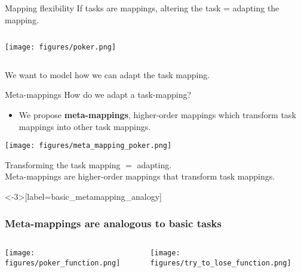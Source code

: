 \documentclass{beamer}
\begin{document}
\begin{frame}{Mapping flexibility}
If tasks are mappings, altering the task = adapting the mapping. 
\begin{columns}
\begin{column}{0.5\textwidth}
\vspace{2em}
\texttt{[image: figures/poker.png]}
\end{column}
\begin{column}{0.5\textwidth}
\vspace{2em}
\end{column}
\end{columns}
\end{frame}

\begin{frame}[standout]
We want to model how we can adapt the task mapping.
\end{frame}

\begin{frame}{Meta-mappings}
How do we adapt a task-mapping?
\begin{itemize}
\item We propose \textbf{meta-mappings}, higher-order mappings which transform task mappings into other task mappings.
\end{itemize}
\texttt{[image: figures/meta\_mapping\_poker.png]}
\end{frame}

\begin{frame}[standout]
Transforming the task mapping \(=\) adapting. \\[1em]
Meta-mappings are higher-order mappings that transform task mappings.
\end{frame}

\begin{frame}<-3>[label=basic_metamapping_analogy]
\frametitle{Meta-mappings are analogous to basic tasks}
\begin{columns}
\begin{column}{0.5\textwidth}
\vspace{2em}
\texttt{[image: figures/poker\_function.png]}
\end{column}
\begin{column}{0.5\textwidth}
\vspace{2em}
\texttt{[image: figures/try\_to\_lose\_function.png]}
\end{column}
\end{columns}
\end{frame}
\end{document}
